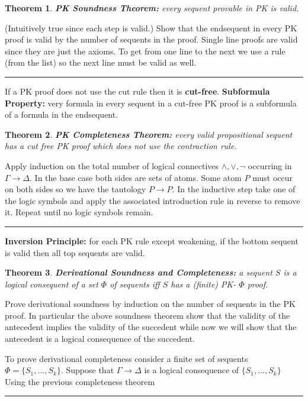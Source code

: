 \documentclass[twoside]{article}
\newcounter{lecnum}
\newtheorem{theorem}{Theorem}[lecnum]
\newenvironment{proof}{{\bf Proof:}}{\hfill\rule{2mm}{2mm}}
\begin{document}
\begin{theorem}
\textbf{PK Soundness Theorem:} every sequent provable in PK is valid.
\end{theorem}
\begin{proof}
(Intuitively true since each step is valid.) Show that the endsequent in every PK proof is valid by the number of sequents in the proof. Single line proofs are valid since they are just the axioms. To get from one line to the next we use a rule (from the list) so the next line must be valid as well. 
\end{proof}

If a PK proof does not use the cut rule then it is \textbf{cut-free}. \textbf{Subformula Property:} very formula in every sequent in a cut-free PK proof is a subformula of a formula in the endsequent. 

\begin{theorem}
\textbf{PK Completeness Theorem:} every valid propositional sequent has a cut free PK proof which does not use the contraction rule.
\end{theorem}
\begin{proof}
Apply induction on the total number of logical connectives $\land, \lor, \lnot$ occurring in $\Gamma \rightarrow \Delta$. In the base case both sides are sets of atoms. Some atom $P$ must occur on both sides so we have the tautology $P \rightarrow P$. In the inductive step take one of the logic symbols and apply the associated introduction rule in reverse to remove it. Repeat until no logic symbols remain. 
\end{proof}

\textbf{Inversion Principle:} for each PK rule except weakening, if the bottom sequent is valid then all top sequents are valid. 

\begin{theorem}
\textbf{Derivational Soundness and Completeness:} a sequent $S$ is a logical consequent of a set $\Phi$ of sequents iff $S$ has a (finite) PK- $\Phi$ proof. 
\end{theorem}
\begin{proof}
Prove derivational soundness by induction on the number of sequents in the PK proof. In particular the above soundness theorem show that the validity of the antecedent implies the validity of the succedent while now we will show that the antecedent is a logical consequence of the succedent. 

To prove derivational completeness consider a finite set of sequents $\Phi = \{S_1, ..., S_k\}$. Suppose that $\Gamma \rightarrow \Delta$ is a logical consequence of $\{S_1, ..., S_k\}$ Using the previous completeness theorem 
\end{proof}
\end{document}
